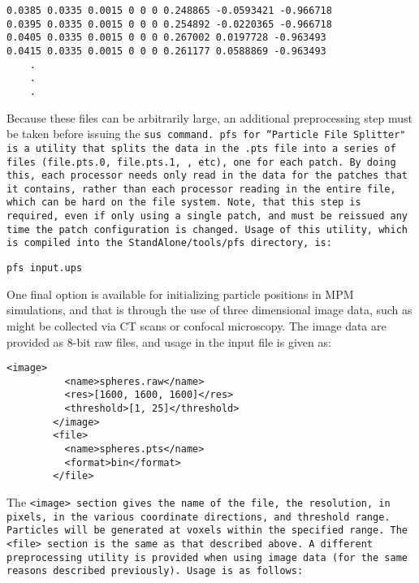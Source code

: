 \begin{Verbatim}[fontsize=\footnotesize]
0.0385 0.0335 0.0015 0 0 0 0.248865 -0.0593421 -0.966718
0.0395 0.0335 0.0015 0 0 0 0.254892 -0.0220365 -0.966718
0.0405 0.0335 0.0015 0 0 0 0.267002 0.0197728 -0.963493
0.0415 0.0335 0.0015 0 0 0 0.261177 0.0588869 -0.963493
	.
	.
	.
\end{Verbatim}
Because these files can be arbitrarily large, an additional preprocessing step
must be taken before issuing the \tt sus \normalfont command.
\tt pfs \normalfont for ``Particle File Splitter" is a utility that splits the
data in the \tt .pts \normalfont file into a series of files
(\tt file.pts.0, file.pts.1, \normalfont, etc), one for each
patch.  By doing this, each processor needs only read in the data for the
patches that it contains, rather than each processor reading in the entire file,
which can be hard on the file system.  Note, that this step is required,
even if only using a single patch, and must be reissued any time the patch
configuration is changed.  Usage of this utility, which is compiled
into the \tt StandAlone/tools/pfs \normalfont directory, is:

\begin{Verbatim}[fontsize=\footnotesize]
   pfs input.ups
\end{Verbatim}

One final option is available for initializing particle positions in MPM
simulations, and that is through the use of three dimensional image data,
such as might be collected via CT scans or confocal microscopy.  The image data are provided as 8-bit raw files, and usage in the input file is given as:

\begin{Verbatim}[fontsize=\footnotesize]
        <image>
          <name>spheres.raw</name>
          <res>[1600, 1600, 1600]</res>
          <threshold>[1, 25]</threshold>
        </image>
        <file>
          <name>spheres.pts</name>
          <format>bin</format>
        </file>
\end{Verbatim}

The \tt <image> \normalfont section gives the name of the file, the resolution, in pixels,
in the various coordinate directions, and threshold range.  Particles will be
generated at voxels within the specified range.  The \tt <file> \normalfont
section is the same as that described above.  A different preprocessing utility
is provided when using image data (for the same reasons described previously).
Usage is as follows:

